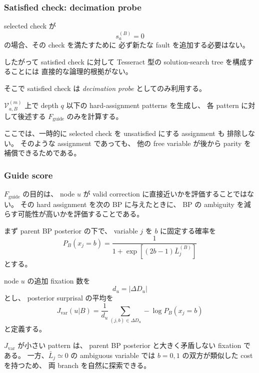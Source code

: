 \subsubsection{Satisfied check: decimation probe}

selected check が
\begin{equation}
    s_a^{(B)}=0
\end{equation}
の場合、その check を満たすために
必ず新たな fault を追加する必要はない。

したがって satisfied check に対して
Tesseract 型の solution-search tree を構成することには
直接的な論理的根拠がない。

そこで satisfied check は
\emph{decimation probe} としてのみ利用する。

$\mathcal{V}_{a,B}^{(m)}$ 上で depth $q$ 以下の
hard-assignment patterns を生成し、
各 pattern に対して後述する
$F_{\mathrm{guide}}$ のみを計算する。

ここでは、一時的に selected check を unsatisfied にする assignment も
排除しない。
そのような assignment であっても、
他の free variable が後から parity を補償できるためである。


\subsubsection{Guide score}

$F_{\mathrm{guide}}$ の目的は、
node $u$ が valid correction に直接近いかを評価することではない。
その hard assignment を次の BP に与えたときに、
BP の ambiguity を減らす可能性が高いかを評価することである。

まず parent BP posterior の下で、
variable $j$ を $b$ に固定する確率を
\begin{equation}
    P_B(x_j=b)
    =
    \frac{
        1
    }{
        1+\exp[(2b-1)\bar L_j^{(B)}]
    }
\end{equation}
とする。

node $u$ の追加 fixation 数を
\begin{equation}
    d_u=|\Delta D_u|
\end{equation}
とし、
posterior surprisal の平均を
\begin{equation}
    J_{\mathrm{var}}(u|B)
    =
    \frac{1}{d_u}
    \sum_{(j,b)\in\Delta D_u}
    -\log P_B(x_j=b)
    \label{eq:variable_surprisal}
\end{equation}
と定義する。

$J_{\mathrm{var}}$ が小さい pattern は、
parent BP posterior と大きく矛盾しない fixation である。
一方、$\bar L_j\simeq0$ の ambiguous variable では
$b=0,1$ の双方が類似した cost を持つため、
両 branch を自然に探索できる。


